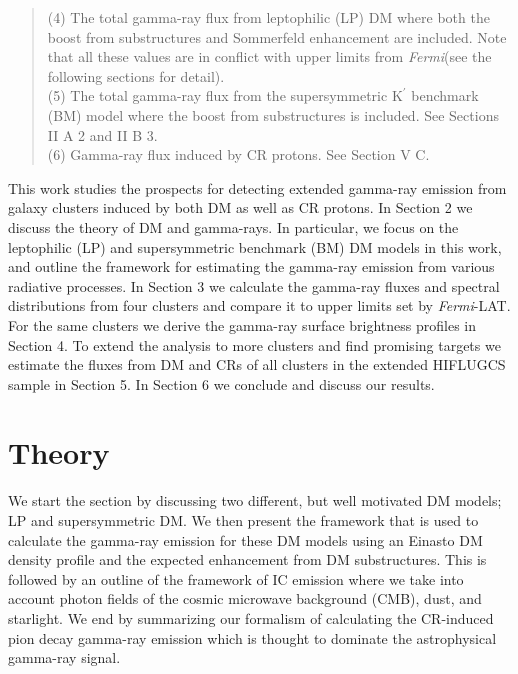 \documentclass[10pt,aps,pra,reprint,amsmath,amsfonts,amssymb,showpacs,nofootinbib,floatfix]{revtex4-1}
\newcommand{\Fermi}{{\em Fermi}\xspace}
\newcommand{\rmn}{\mathrm}
\newcommand{\Kp}{\rmn{K}^\prime}
\begin{document}
\begin{table}
\begin{minipage}{2.0\columnwidth}
\begin{quote}
  (4) The total gamma-ray flux from leptophilic (LP) DM where both the
  boost from substructures and Sommerfeld enhancement are
  included. Note that all these values are in conflict with upper limits from
  \Fermi (see the following sections for detail).\\
  (5) The total gamma-ray flux from the supersymmetric $\Kp$ benchmark (BM)
  model where the boost from substructures is included. See Sections II A 2 and II B 3.\\
  (6) Gamma-ray flux induced by CR protons. See Section V C.
 \label{tab:flux_tab}
  \end{quote}
\end{minipage}
\end{table}

This work studies the prospects for detecting extended gamma-ray
emission from galaxy clusters induced by both DM as well as CR
protons. In Section 2 we discuss the theory of DM and gamma-rays. In
particular, we focus on the leptophilic (LP) and supersymmetric
benchmark (BM) DM models in this work, and outline the framework
for estimating the gamma-ray emission from various radiative
processes. In Section 3 we calculate the gamma-ray fluxes and spectral
distributions from four clusters and compare it to upper limits set by
\Fermi-LAT. For the same clusters we derive the gamma-ray surface
brightness profiles in Section 4. To extend the analysis to more
clusters and find promising targets we estimate the fluxes from DM and
CRs of all clusters in the extended HIFLUGCS sample in Section 5. In
Section 6 we conclude and discuss our results.

\section{Theory}
\label{sect:theory}
We start the section by discussing two different, but well motivated
DM models; LP and supersymmetric DM. We then present the framework
that is used to calculate the gamma-ray emission for these DM models
using an Einasto DM density profile and the expected enhancement from
DM substructures. This is followed by an outline of the framework of
IC emission where we take into account photon fields of the cosmic
microwave background (CMB), dust, and starlight. We end by summarizing
our formalism of calculating the CR-induced pion decay gamma-ray
emission which is thought to dominate the astrophysical gamma-ray
signal.
\end{document}
